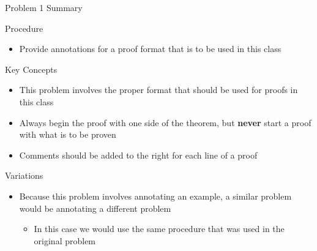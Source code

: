 \begin{summary}{Problem 1 Summary}
    \begin{statement}{Procedure}
        \begin{itemize}
            \item Provide annotations for a proof format that is to be used in this class
        \end{itemize}
    \end{statement}
    \begin{statement}{Key Concepts}
        \begin{itemize}
            \item This problem involves the proper format that should be used for proofs in this class
            \item Always begin the proof with one side of the theorem, but \textbf{never} start a proof with what is to be proven
            \item Comments should be added to the right for each line of a proof
        \end{itemize}
    \end{statement}
    \begin{statement}{Variations}
        \begin{itemize}
            \item Because this problem involves annotating an example, a similar problem would be annotating a different problem
            \begin{itemize}
                \item In this case we would use the same procedure that was used in the original problem
            \end{itemize}
        \end{itemize}
    \end{statement}
\end{summary}

